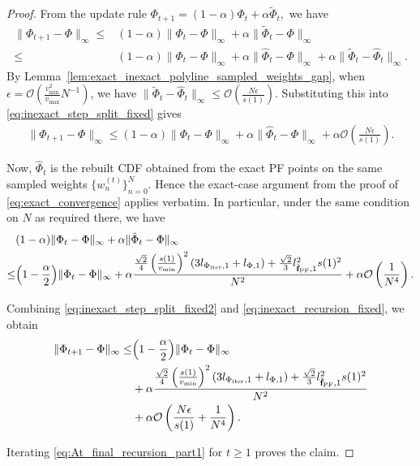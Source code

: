 \documentclass{article}
\newcommand{\Oc}{\mathcal{O}}
\newcommand{\f}{\mathbf{f}}
\newcommand{\Farc}{\Phi}
\begin{document}
\begin{proof}
From the update rule
$
\Farc_{t+1}=(1-\alpha)\Farc_t+\alpha \tilde \Farc_t,
$
we have
\begin{align}
\|\Farc_{t+1}-\Farc\|_\infty
\leq &
(1-\alpha)\|\Farc_t-\Farc\|_\infty+\alpha\|\tilde \Farc_t-\Farc\|_\infty
\nonumber\\
\leq &
(1-\alpha)\|\Farc_t-\Farc\|_\infty
+\alpha\|\hat \Farc_t-\Farc\|_\infty
+\alpha\|\tilde \Farc_t-\hat \Farc_t\|_\infty.
\label{eq:inexact_step_split_fixed}
\end{align}
By Lemma~\ref{lem:exact_inexact_polyline_sampled_weights_gap}, when $\epsilon= \Oc\left(\frac{v_{\min}^2}{v_{\max}}N^{-1}\right)$, we have $\|\tilde \Farc_t-\hat \Farc_t\|_\infty
\le
\Oc\left(
\frac{N\epsilon}{s(1)}
\right)$.
Substituting this into \eqref{eq:inexact_step_split_fixed} gives
\begin{align}
 \|\Farc_{t+1}-\Farc\|_\infty \le (1-\alpha)\|\Farc_t-\Farc\|_\infty +\alpha\|\hat \Farc_t-\Farc\|_\infty +\alpha\Oc\left( \frac{N\epsilon}{s(1)} \right).
 \label{eq:inexact_step_split_fixed2}
\end{align}

Now, $\hat \Farc_t$ is the rebuilt CDF obtained from the exact PF points on the
same sampled weights $\{w_n^{(t)}\}_{n=0}^N$. Hence the exact-case argument from
the proof of \eqref{eq:exact_convergence} applies verbatim. In
particular, under the same condition on $N$ as required there, we have
\begin{align}
&(1-\alpha)\|\Farc_t-\Farc\|_\infty
+\alpha\|\hat \Farc_t-\Farc\|_\infty
\nonumber\\
\le&
\Bigl(1-\frac{\alpha}{2}\Bigr)\|\Farc_t-\Farc\|_\infty
+
\alpha
\frac{
\frac{\sqrt{2}}{4}
\left(\frac{s(1)}{v_{\min}}\right)^2
(3l_{\Farc_{\rm iter},1}+l_{\Farc,1})
+
\frac{\sqrt{2}}{3}
l_{\tilde{\f}_{\mathrm{PF}},1}^2s(1)^2
}{N^2}
+
\alpha\Oc\left(\frac{1}{N^4}\right).
\label{eq:inexact_recursion_fixed}
\end{align}



Combining \eqref{eq:inexact_step_split_fixed2} and \eqref{eq:inexact_recursion_fixed}, we obtain
\begin{align}
\|\Farc_{t+1}-\Farc\|_\infty
\le&
\Bigl(1-\frac{\alpha}{2}\Bigr)\|\Farc_t-\Farc\|_\infty
\nonumber\\
&+
\alpha
\frac{
\frac{\sqrt{2}}{4}
\left(\frac{s(1)}{v_{\min}}\right)^2
(3l_{\Farc_{\rm iter},1}+l_{\Farc,1})
+
\frac{\sqrt{2}}{3}
l_{\tilde{\f}_{\mathrm{PF}},1}^2s(1)^2
}{N^2}
\nonumber\\
&+
\alpha\Oc\left(
\frac{N\epsilon}{s(1)}
+
\frac{1}{N^4}
\right).
\label{eq:At_final_recursion_part1}
\end{align}

Iterating \eqref{eq:At_final_recursion_part1} for $t\ge 1$ proves the claim.
\end{proof}
\end{document}
